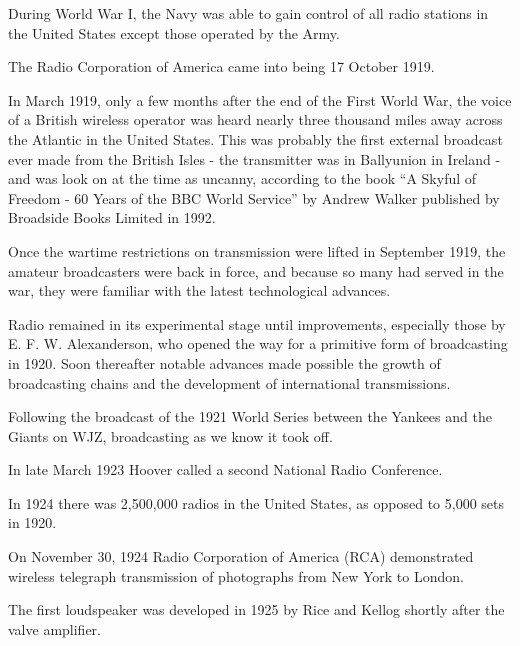 \documentclass[a4paper,norsk,utf8]{report}
\begin{document}
    During World War I, the Navy was able to gain control of all radio
    stations in the United States except those operated by the Army.

    The Radio Corporation of America came into being 17 October 1919.
    
    In March 1919, only a few months after the end of the First World
    War, the voice of a British wireless operator was heard nearly
    three thousand miles away across the Atlantic in the United
    States.  This was probably the first external broadcast ever made
    from the British Isles - the transmitter was in Ballyunion in
    Ireland - and was look on at the time as uncanny, according to the
    book ``A Skyful of Freedom - 60 Years of the BBC World Service''
    by Andrew Walker published by Broadside Books Limited in 1992.

    Once the wartime restrictions on transmission were lifted in September
    1919, the amateur broadcasters were back in force, and because so many
    had served in the war, they were familiar with the latest technological
    advances.

    Radio remained in its experimental stage until improvements,
    especially those by E. F. W. Alexanderson, who opened the way for a
    primitive form of broadcasting in 1920.  Soon thereafter notable
    advances made possible the growth of broadcasting chains and the
    development of international transmissions.

    Following the broadcast of the 1921 World Series between the Yankees and
    the Giants on WJZ, broadcasting as we know it took off.

    In late March 1923 Hoover called a second National Radio Conference.

    In 1924 there was 2,500,000 radios in the United States, as opposed to
    5,000 sets in 1920.

    On November 30, 1924 Radio Corporation of America (RCA)
    demonstrated wireless telegraph transmission of photographs from
    New York to London.

    The first loudspeaker was developed in 1925 by Rice and Kellog shortly
    after the valve amplifier.
\end{document}
